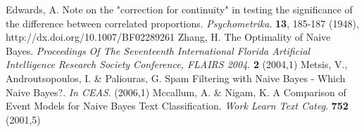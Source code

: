 \let\LaTeXcline\cline\documentclass[sn-mathphys-num]{sn-jnl}\let\cline\LaTeXcline
\begin{document}
\begin{thebibliography}{00}
Edwards, A. Note on the "correction for continuity" in testing the significance of the difference between correlated proportions. {\em Psychometrika}. \textbf{13}, 185-187 (1948), http://dx.doi.org/10.1007/BF02289261
Zhang, H. The Optimality of Naive Bayes. {\em Proceedings Of The Seventeenth International Florida Artificial Intelligence Research Society Conference, FLAIRS 2004}. \textbf{2} (2004,1)
Metsis, V., Androutsopoulos, I. \& Paliouras, G. Spam Filtering with Naive Bayes - Which Naive Bayes?. {\em In CEAS}. (2006,1)
Mccallum, A. \& Nigam, K. A Comparison of Event Models for Naive Bayes Text Classification. {\em Work Learn Text Categ}. \textbf{752} (2001,5)


\end{thebibliography}
\end{document}
